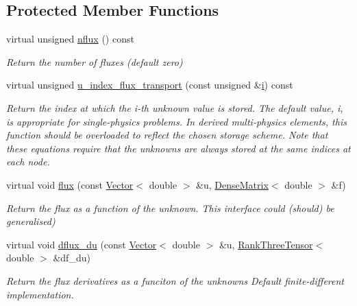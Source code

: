 \subsection*{Protected Member Functions}
\begin{DoxyCompactItemize}
\item 
virtual unsigned \hyperlink{classoomph_1_1FluxTransportEquations_ae77531d3bdd9241f450fdb360e7a5cc9}{nflux} () const
\begin{DoxyCompactList}\small\item\em Return the number of fluxes (default zero) \end{DoxyCompactList}\item 
virtual unsigned \hyperlink{classoomph_1_1FluxTransportEquations_a2de975b809b4c8a91dc5e0050dd5c9c1}{u\+\_\+index\+\_\+flux\+\_\+transport} (const unsigned \&\hyperlink{cfortran_8h_adb50e893b86b3e55e751a42eab3cba82}{i}) const
\begin{DoxyCompactList}\small\item\em Return the index at which the i-\/th unknown value is stored. The default value, i, is appropriate for single-\/physics problems. In derived multi-\/physics elements, this function should be overloaded to reflect the chosen storage scheme. Note that these equations require that the unknowns are always stored at the same indices at each node. \end{DoxyCompactList}\item 
virtual void \hyperlink{classoomph_1_1FluxTransportEquations_ab6ed40337620462e5c6e992081c1612a}{flux} (const \hyperlink{classoomph_1_1Vector}{Vector}$<$ double $>$ \&u, \hyperlink{classoomph_1_1DenseMatrix}{Dense\+Matrix}$<$ double $>$ \&f)
\begin{DoxyCompactList}\small\item\em Return the flux as a function of the unknown. This interface could (should) be generalised) \end{DoxyCompactList}\item 
virtual void \hyperlink{classoomph_1_1FluxTransportEquations_a85c3239c26cb1fb4ddd102759eb0fc0d}{dflux\+\_\+du} (const \hyperlink{classoomph_1_1Vector}{Vector}$<$ double $>$ \&u, \hyperlink{classoomph_1_1RankThreeTensor}{Rank\+Three\+Tensor}$<$ double $>$ \&df\+\_\+du)
\begin{DoxyCompactList}\small\item\em Return the flux derivatives as a funciton of the unknowns Default finite-\/different implementation. \end{DoxyCompactList}\item 

\end{DoxyCompactItemize}
